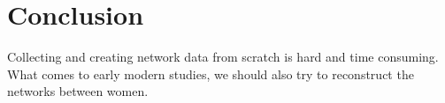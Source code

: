 \section{Conclusion}
Collecting and creating network data from scratch is hard and time consuming. 
What comes to early modern studies, we should also try to reconstruct the networks between women. 

